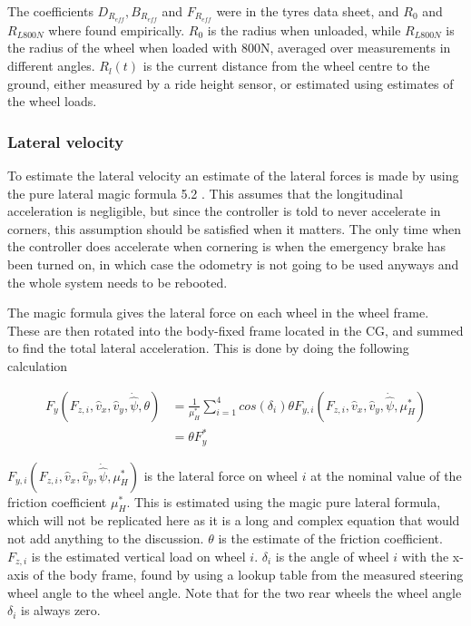 The coefficients $D_{R_{eff}}, B_{R_{eff}}$ and $F_{R_{eff}}$ were in the tyres data sheet, and $R_0$ and $R_{L800N}$ where found empirically. $R_0$ is the radius when unloaded, while $R_{L800N}$ is the radius of the wheel when loaded with 800N, averaged over measurements in different angles. $R_l(t)$ is the current distance from the wheel centre to the ground, either measured by a ride height sensor, or estimated using estimates of the wheel loads.

\subsubsection{Lateral velocity} 
To estimate the lateral velocity an estimate of the lateral forces is made by using the pure lateral magic formula 5.2 \cite{MagicFormula5_2}. This assumes that the longitudinal acceleration is negligible, but since the controller is told to never accelerate in corners, this assumption should be satisfied when it matters. The only time when the controller does accelerate when cornering is when the emergency brake has been turned on, in which case the odometry is not going to be used anyways and the whole system needs to be rebooted. 

The magic formula gives the lateral force on each wheel in the wheel frame. These are then rotated into the body-fixed frame located in the \gls{CG}, and summed to find the total lateral acceleration. This is done by doing the following calculation

\begin{align}
    F_y(F_{z,i},\hat{v}_x,\hat{v}_y,\dot{\hat{\psi}}, \theta) & = \frac{1}{\mu_{H}^{*}}\sum_{i=1}^{4}cos(\delta_i)\theta F_{y,i}(F_{z,i},\hat{v}_x,\hat{v}_y,\dot{\hat{\psi}}, \mu_{H}^{*}) \\
    & =  \theta F_y^{*}
\end{align}

$F_{y,i}(F_{z,i},\hat{v}_x,\hat{v}_y,\dot{\hat{\psi}}, \mu_{H}^{*})$ is the lateral force on wheel $i$ at the nominal value of the friction coefficient $\mu_{H}^{*}$. This is estimated using the magic pure lateral formula, which will not be replicated here as it is a long and complex equation that would not add anything to the discussion. $\theta$ is the estimate of the friction coefficient. $F_{z,i}$ is the estimated vertical load on wheel $i$. $\delta_i$ is the angle of wheel $i$ with the x-axis of the body frame, found by using a lookup table from the measured steering wheel angle to the wheel angle. Note that for the two rear wheels the wheel angle $\delta_i$ is always zero. 


